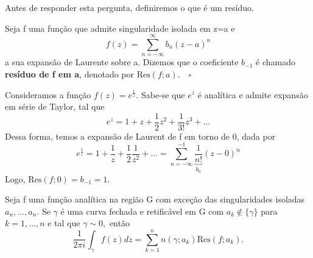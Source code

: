 \documentclass[ComplexAnalysis/complex.tex]{subfiles}
\begin{document}
Antes de responder esta pergunta, definiremos o que é um resíduo.
\begin{def*}
	Seja f uma função que admite singularidade isolada em z=a e
	\[
		f(z) = \sum\limits_{n=-\infty}^{\infty}b_{n}(z-a)^{n}
	\]
	a sua expansão de Laurente sobre a. Dizemos que o coeficiente \(b_{-1}\) é chamado \textbf{resíduo de f em a},
	denotado por \(\mathrm{Res}(f; a).\quad \square\)
\end{def*}
\begin{example}
	Consideramos a função \(f(z) = e^{\frac{1}{z}}.\) Sabe-se que \(e^{z}\) é analítica e admite expansão em série
	de Taylor, tal que
	\[
		e^{z} = 1 + z + \frac{1}{2}z^{2} + \frac{1}{3!}z^{3} + \dotsc
	\]
	Dessa forma, temos a expansão de Laurent de f em torno de 0, dada por
	\[
		e^{\frac{1}{z}} = 1 + \frac{1}{z} + \frac{1}{2}\frac{1}{z^{2}}+\dotsc  = \sum\limits_{n=-\infty}^{-1}\underbrace{\frac{1}{n!}}_{b_{n}}(z-0)^{n}
	\]
	Logo, \(\mathrm{Res}(f; 0) = b_{-1} = 1.\)
\end{example}
\hypertarget{residue}{ \begin{theorem*}
		Seja f uma função analítica na região G com exceção das singularidades isoladas \(a_{n},\dotsc ,a_{n}.\) Se \(\gamma \) é uma curva fechada e retificável
		em G com \(a_{k}\not\in\{\gamma \}\) para \(k=1, \dotsc , n\) e tal que \(\gamma \sim 0,\) então
		\[
			\frac{1}{2\pi i}\int_{\gamma }^{}f(z)dz = \sum\limits_{k=1}^{n}n(\gamma; a_{k})\mathrm{Res}(f; a_{k}).
		\]
	\end{theorem*}}
\end{document}
